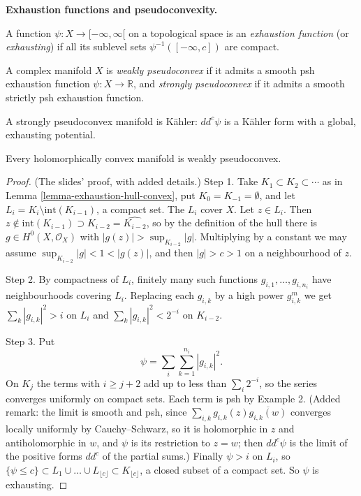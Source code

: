 \medskip\noindent
{\bf Exhaustion functions and
pseudoconvexity.}

\begin{definition}
\label{definition-exhaustion-function}
A function $\psi\colon X\to[-\infty,\infty[$
on a topological space is an
\textit{exhaustion function} (or
\textit{exhausting}) if all its sublevel sets
$\psi^{-1}([-\infty,c])$ are compact.
\end{definition}

\begin{definition}
\label{definition-weakly-pseudoconvex}
A complex manifold $X$ is \textit{weakly
pseudoconvex} if it admits a smooth psh
exhaustion function $\psi\colon
X\to\mathbb{R}$, and \textit{strongly
pseudoconvex} if it admits a smooth strictly
psh exhaustion function.
\end{definition}

\noindent
A strongly pseudoconvex manifold is K\"ahler:
$dd^c\psi$ is a K\"ahler form with a global,
exhausting potential.

\begin{theorem}
\label{theorem-holconvex-weakly-pseudoconvex}
Every holomorphically convex manifold is
weakly pseudoconvex.
\end{theorem}

\begin{proof}
(The slides' proof, with added details.)
Step 1. Take $K_1\subset
K_2\subset\cdots$ as in Lemma
\ref{lemma-exhaustion-hull-convex}, put
$K_0=K_{-1}=\emptyset$, and let
$L_i=K_i\setminus\mathrm{int}(K_{i-1})$, a
compact set. The $L_i$ cover $X$. Let $z\in
L_i$. Then
$z\notin\mathrm{int}(K_{i-1})\supset
K_{i-2}=\widehat{K_{i-2}}$, so by the
definition of the hull there is $g\in
H^0(X,\mathcal{O}_X)$ with
$|g(z)|>\sup_{K_{i-2}}|g|$. Multiplying by a
constant we may assume
$\sup_{K_{i-2}}|g|<1<|g(z)|$, and then
$|g|>c>1$ on a neighbourhood of $z$.

Step 2. By compactness of $L_i$, finitely
many such functions $g_{i,1},\dots,g_{i,n_i}$
have neighbourhoods covering $L_i$. Replacing
each $g_{i,k}$ by a high power $g_{i,k}^m$ we
get $\sum_k|g_{i,k}|^2>i$ on $L_i$ and
$\sum_k|g_{i,k}|^2<2^{-i}$ on $K_{i-2}$.

Step 3. Put
$$
\psi=\sum_i\sum_{k=1}^{n_i}|g_{i,k}|^2 .
$$
On $K_j$ the terms with $i\geq j+2$ add up to
less than $\sum_i 2^{-i}$, so the series
converges uniformly on compact sets. Each
term is psh by Example 2. (Added remark: the
limit is smooth and psh, since
$\sum_{i,k}g_{i,k}(z)\overline{g_{i,k}(w)}$
converges locally uniformly by
Cauchy--Schwarz, so it is holomorphic in $z$
and antiholomorphic in $w$, and $\psi$ is its
restriction to $z=w$; then $dd^c\psi$ is the
limit of the positive forms $dd^c$ of the
partial sums.) Finally $\psi>i$ on $L_i$, so
$\{\psi\leq c\}\subset L_1\cup\dots\cup
L_{\lfloor c\rfloor}\subset K_{\lfloor
c\rfloor}$, a closed subset of a compact set.
So $\psi$ is exhausting.
\end{proof}

